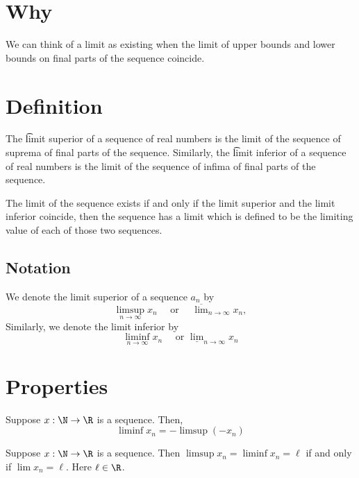 
\section*{Why}

We can think of a limit as existing when the limit of upper bounds and lower bounds on final parts of the sequence coincide.

\section*{Definition}

The \t{limit superior} of a sequence of real numbers is the limit of the sequence of suprema of final parts of the sequence.
Similarly, the \t{limit inferior} of a sequence of real numbers is the limit of the sequence of infima of final parts of the sequence.

The limit of the sequence exists if and only if the limit superior and the limit inferior coincide, then the sequence has a limit which is defined to be the limiting value of each of those two sequences.

\subsection*{Notation}

We denote the limit superior of a sequence $a_n$ by
\[
\limsup_{n \to \infty} x_n \quad \text{ or } \quad \overline{\lim}_{n \to \infty} x_n,
\]
Similarly, we denote the limit inferior by
\[
\liminf_{n \to \infty} x_n \quad \text{ or } \underline{\lim}_{n \to \infty} x_n
\]

\section*{Properties}

\begin{proposition}
Suppose $x: \N   \to \R $ is a sequence.
Then,
\[
\liminf x_n = - \limsup (-x_n)
\]
\end{proposition}

\begin{proposition}
Suppose $x: \N   \to \R $ is a sequence.
Then $\limsup x_n = \liminf x_n = \ell $ if and only if $\lim x_n = \ell $.
Here $\ell  \in \R $.
\end{proposition}

\blankpage
